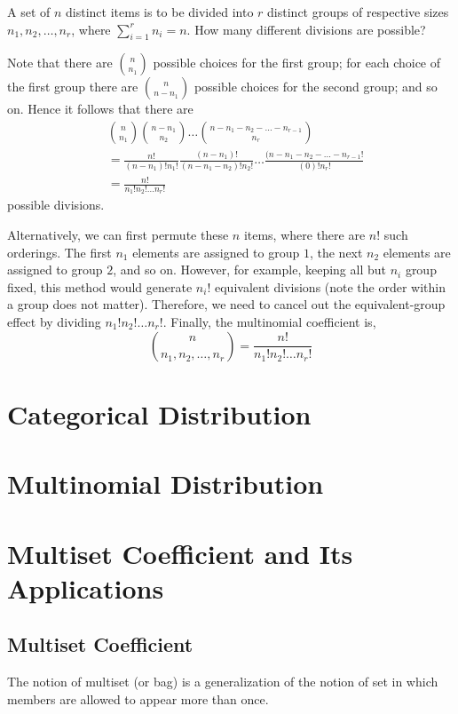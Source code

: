\begin{prob}
	A set of $n$ distinct items is to be divided into $r$ distinct groups of respective sizes $n_1, n_2, \ldots, n_r$, where $\sum^r_{i=1} n_i = n$. How many different divisions are possible?
\end{prob}
Note that there are $n \choose n_1$ possible choices for the first group; for each choice of the first group there are $n \choose n-n_1$ possible choices for the second group; and so on. Hence it follows that there are
\begin{equation*}
\begin{split}
	& {n \choose n_1} {n-n_1 \choose n_2} \ldots {n-n_1-n_2- \ldots -n_{r-1} \choose n_r} \\
	& = \frac{n!}{(n-n_1)!n_1!} \frac{(n-n_1)!}{(n-n_1-n_2)!n_2!} \ldots \frac{(n-n_1-n_2- \ldots -n_{r-1}!}{(0)!n_r!} \\
	& = \frac{n!}{n_1!n_2! \ldots n_r!}
\end{split}
\end{equation*}
possible divisions.

Alternatively, we can first permute these $n$ items, where there are $n!$ such orderings. The first $n_1$ elements are assigned to group $1$, the next $n_2$ elements are assigned to group $2$, and so on. However, for example, keeping all but $n_i$ group fixed, this method would generate $n_i!$ equivalent divisions (note the order within a group does not matter). Therefore, we need to cancel out the equivalent-group effect by dividing $n_1!n_2! \ldots n_r!$. Finally, the multinomial coefficient is,
\begin{equation}
	{n \choose n_1,n_2,\ldots,n_r} = \frac{n!}{n_1!n_2! \ldots n_r!}
\end{equation}

\section{Categorical Distribution}
\section{Multinomial Distribution}


\section{Multiset Coefficient and Its Applications}
\subsection{Multiset Coefficient}
The notion of multiset (or bag) is a generalization of the notion of set in which members are allowed to appear more than once.

